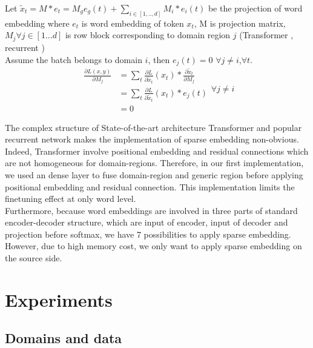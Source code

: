 \documentclass[11pt,a4paper]{article}
\newcommand{\fyTodo}[1]{\Todo[FY:]{\textcolor{orange}{#1}}}
\begin{document}
Let $\tilde{x}_{t} = M * e_{t} = M_g e_g(t) + \displaystyle{\mathop{\sum}_{i \in [1,..,d]} M_i * e_i(t)}$ be the projection of word embedding where $e_{t}$ is word embedding of token $x_{t}$, M is projection matrix, $M_j \forall j \in [1...d]$ is row block corresponding to domain region $j$ (Transformer \cite{Vaswani17attention}, recurrent \cite{Bahdanau15learning})\\
Assume the batch belongs to domain $i$, then $e_j(t) = 0$ $\forall j \neq i$,$\forall t$. 
\begin{equation}
\begin{split}
\frac{\partial L(x,y)}{\partial M_j} &= \sum_{t}\frac{\partial L}{\partial \tilde{x}_t}(x_t) * \frac{\partial \tilde{x}_t}{\partial M_j} \\
								&= \sum_{t} \frac{\partial L}{\partial \tilde{x}_t}(x_t) * e_j(t)\\
									&=0
\end{split} 
\forall j \neq i
\end{equation}

The complex structure of State-of-the-art architecture Transformer \cite{Vaswani17attention} and popular recurrent network \cite{Bahdanau15learning} makes the implementation of sparse embedding non-obvious. Indeed, Transformer involve positional embedding and residual connections which are not homogeneous for domain-regions. Therefore, in our first implementation, we used an dense layer to fuse domain-region and generic region before applying positional embedding and residual connection. This implementation limits the finetuning effect at only word level.\\
Furthermore, because word embeddings are involved in three parts of standard encoder-decoder structure, which are input of encoder, input of decoder and projection before softmax, we have 7 possibilities to apply sparse embedding. However, due to high memory cost, we only want to apply sparse embedding on the source side. \fyTodo{Explain this. Future work ?}

\section{Experiments \label{sec:experiments}}

\subsection{Domains and data \label{ssec:data}}
\end{document}
